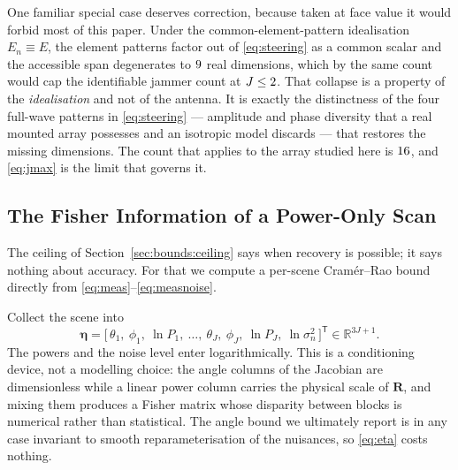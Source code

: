 \documentclass[journal]{IEEEtran}
\newcommand{\Rt}{\mathbf{R}}
\newcommand{\Tr}{\mathsf{T}}
\begin{document}
One familiar special case deserves correction, because taken at face value it
would forbid most of this paper. Under the common-element-pattern idealisation
$E_n \equiv E$, the element patterns factor out of \eqref{eq:steering} as a
common scalar and the accessible span degenerates to $9$ real
dimensions, which by the same count would cap the identifiable jammer count at
$J \le 2$. That collapse is a property of the \emph{idealisation}
and not of the antenna. It is exactly the distinctness of the four full-wave
patterns in \eqref{eq:steering} --- amplitude and phase diversity that a real
mounted array possesses and an isotropic model discards --- that restores the
missing dimensions. The count that applies to the array studied here is
$16$, and \eqref{eq:jmax} is the limit that governs it.

\subsection{The Fisher Information of a Power-Only Scan}
\label{sec:bounds:fim}

The ceiling of Section~\ref{sec:bounds:ceiling} says when recovery is possible;
it says nothing about accuracy. For that we compute a per-scene
Cram\'er--Rao bound directly from
\eqref{eq:meas}--\eqref{eq:measnoise}.

Collect the scene into
\begin{equation}
\bm{\eta} = \big[\,
\theta_1,\ \phi_1,\ \ln P_1,\ \dots,\
\theta_J,\ \phi_J,\ \ln P_J,\ \ln \sigma_n^2
\,\big]^{\Tr} \in \mathbb{R}^{3J+1}.
\label{eq:eta}
\end{equation}
The powers and the noise level enter logarithmically. This is a
conditioning device, not a modelling choice: the angle columns of the Jacobian
are dimensionless while a linear power column carries the physical scale of
$\Rt$, and mixing them produces a Fisher matrix whose disparity between blocks
is numerical rather than statistical. The angle bound we ultimately report is
in any case invariant to smooth reparameterisation of the nuisances, so
\eqref{eq:eta} costs nothing.
\end{document}
